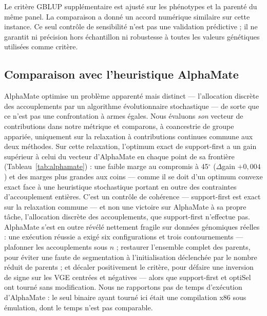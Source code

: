 \documentclass[11pt]{article}
\begin{document}
Le critère GBLUP supplémentaire est ajusté sur les phénotypes et la parenté du même panel. La comparaison a donné un accord numérique similaire sur cette instance. Ce seul contrôle de sensibilité n'est pas une validation prédictive ; il ne garantit ni précision hors échantillon ni robustesse à toutes les valeurs génétiques utilisées comme critère.

\subsection{Comparaison avec l'heuristique AlphaMate}

AlphaMate optimise un problème apparenté mais distinct --- l'allocation discrète des accouplements par un algorithme évolutionnaire stochastique --- de sorte que ce n'est pas une confrontation à armes égales. Nous évaluons \emph{son} vecteur de contributions dans notre métrique et comparons, à coancestrie de groupe appariée, uniquement sur la relaxation à contributions continues commune aux deux méthodes. Sur cette relaxation, l'optimum exact de support-first a un gain supérieur à celui du vecteur d'AlphaMate en chaque point de sa frontière (Tableau~\ref{tab:alphamate}) : une faible marge au compromis à 45$^\circ$ ($\Delta$gain $+0{,}004$) et des marges plus grandes aux coins --- comme il se doit d'un optimum convexe exact face à une heuristique stochastique portant en outre des contraintes d'accouplement entières. C'est un contrôle de cohérence --- support-first est exact sur la relaxation commune --- et non une victoire sur AlphaMate à sa propre tâche, l'allocation discrète des accouplements, que support-first n'effectue pas. AlphaMate s'est en outre révélé nettement fragile sur données génomiques réelles : une exécution réussie a exigé six configurations et trois contournements --- plafonner les accouplements sous $n$ ; restaurer l'ensemble complet des parents, pour éviter une faute de segmentation à l'initialisation déclenchée par le nombre réduit de parents ; et décaler positivement le critère, pour défaire une inversion de signe sur les VGE centrées et négatives --- alors que support-first et optiSel ont tourné sans modification. Nous ne rapportons pas de temps d'exécution d'AlphaMate : le seul binaire ayant tourné ici était une compilation x86 sous émulation, dont le temps n'est pas comparable.
\end{document}
